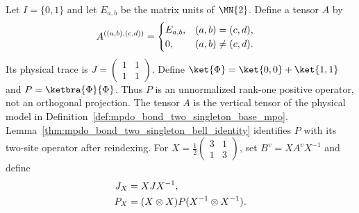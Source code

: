 \begin{definition}%
    \label{def:mpdo_bond_two_singleton_deformation}
    \leanok
    Let $I=\{0,1\}$ and let $E_{a,b}$ be the matrix units of
    $\MN{2}$. Define a tensor $A$ by
    \begin{align}
        A^{((a,b),(c,d))}
         & =\begin{cases}
                E_{a,b}, & (a,b)=(c,d),   \\
                0,       & (a,b)\ne(c,d).
            \end{cases}
        \notag
    \end{align}
    Its physical trace is $J=\begin{pmatrix}1&1\\1&1\end{pmatrix}$.
    Define $\ket{\Phi}=\ket{0,0}+\ket{1,1}$ and
    $P=\ketbra{\Phi}{\Phi}$. Thus $P$ is an unnormalized rank-one positive
    operator, not an orthogonal projection.
    The tensor $A$ is the vertical tensor of the physical model in
    Definition~\ref{def:mpdo_bond_two_singleton_base_mpo}.
    Lemma~\ref{thm:mpdo_bond_two_singleton_bell_identity} identifies $P$
    with its two-site operator after reindexing.
    For $X=\frac12\begin{pmatrix}3&1\\1&3\end{pmatrix}$, set
    $B^v=XA^vX^{-1}$ and define
    \begin{align}
        J_X & =XJX^{-1},
        \notag                                      \\
        P_X & =(X\otimes X)P(X^{-1}\otimes X^{-1}).
        \notag
    \end{align}
\end{definition}


